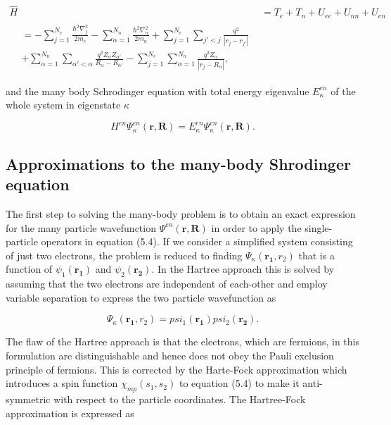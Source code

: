 \begin{align}
    \hat{H} &= T_e + T_n + U_{ee} + U_{nn} + U_{en} \\
    \begin{split}
        &= -\sum_{j=1}^{N_e}\frac{\hbar^2\nabla_j ^2}{2m_e} - \sum_{\alpha=1}^{N_n}\frac{\hbar^2 \nabla_\alpha ^2}{2m_n} + \sum_{j=1}^{N_e}\sum_{j'<j}\frac{q^2}{|r_j - r_{j'}|} \\
    &+ \sum_{\alpha=1}^{N_n}\sum_{\alpha' < \alpha}\frac{q^2Z_\alpha Z_{\alpha'}}{R_\alpha - R_{\alpha'}} -\sum_{j=1}^{N_e}\sum_{\alpha=1}^{N_n}\frac{q^2Z_\alpha}{|r_j - R_\alpha|},
    \end{split}
\end{align} 
 
and the many body Schrodinger equation with total energy eigenvalue $E_{\kappa}^{en}$ of the whole system in eigenstate $\kappa$
 
\begin{equation}
H^{en}\Psi^{en}_{\kappa}(\boldsymbol{r}, \boldsymbol{R}) = E_{\kappa}^{en}\Psi_{\kappa}^{en}(\boldsymbol{r}, \boldsymbol{R}).
\end{equation}

\subsection{Approximations to the many-body Shrodinger equation}

The first step to solving the many-body problem is to obtain an exact expression for the many particle wavefunction $\Psi^{en}(\boldsymbol{r}, \boldsymbol{R})$ in order to apply the single-particle operators in equation (5.4). If we consider a simplified system consisting of just two electrons, the problem is reduced to finding $\Psi_{\kappa}(\boldsymbol{r_1}, r_2)$ that is a function of $\psi_1(\boldsymbol{r_1})$ and $\psi_2(\boldsymbol{r_2})$. In the Hartree approach this is solved by assuming that the two electrons are independent of each-other and employ variable separation to express the two particle wavefunction as

\begin{equation}
\Psi_{\kappa}(\boldsymbol{r_1}, r_2) = psi_1(\boldsymbol{r_1})psi_2(\boldsymbol{r_2}).
\end{equation}

The flaw of the Hartree approach is that the electrons, which are fermions, in this formulation are distinguishable and hence does not obey the Pauli exclusion principle of fermions. This is corrected by the Harte-Fock approximation which introduces a spin function $\chi_{mp}(s_1, s_2)$ to equation (5.4) to make it anti-symmetric with respect to the particle coordinates. The Hartree-Fock approximation is expressed as

